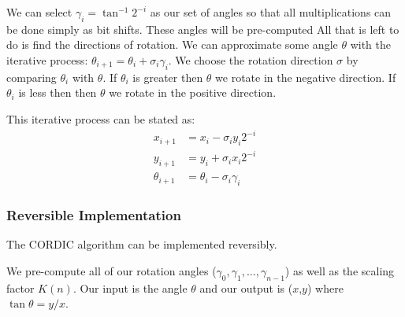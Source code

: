         We can select $\gamma_i = \tan^{-1}2^{-i}$ as our set of angles so that all multiplications can be done simply as bit shifts.
        These angles will be pre-computed
        All that is left to do is find the directions of rotation.
        We can approximate some angle $\theta$ with the iterative process: $\theta_{i+1} = \theta_i + \sigma_i\gamma_i$.
        We choose the rotation direction $\sigma$ by comparing $\theta_i$ with $\theta$.
        If $\theta_i$ is greater then $\theta$ we rotate in the negative direction.
        If $\theta_i$ is less then then $\theta$ we rotate in the positive direction.

        This iterative process can be stated as:
        \begin{equation}\label{eq:cordIter}
            \begin{aligned}
                x_{i+1}      &= x_i - \sigma_iy_i2^{-i}\\
                y_{i+1}      &= y_i + \sigma_ix_i2^{-i}\\
                \theta_{i+1} &= \theta_i - \sigma_i\gamma_i
            \end{aligned}
        \end{equation}

    \subsubsection{Reversible Implementation}

    The CORDIC algorithm can be implemented reversibly.

	We pre-compute all of our rotation angles
	($\gamma_0,\gamma_1,\dotsc,\gamma_{n-1}$) as well as the scaling factor
	$K(n)$. Our input is the angle $\theta$ and our output is ($x$,$y$)
	where $\tan\theta = y/x$.

